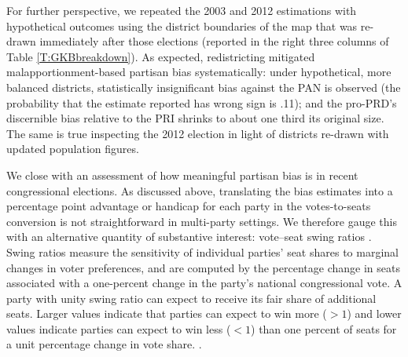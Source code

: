 \documentclass[letter,12pt]{article}
\let\footnote=\endnote
\begin{document}

For further perspective, we repeated the 2003 and 2012 estimations with hypothetical outcomes using the district boundaries of the map that was re-drawn immediately after those elections (reported in the right three columns of Table \ref{T:GKBbreakdown}). As expected, redistricting mitigated malapportionment-based partisan bias systematically: under hypothetical, more balanced districts, statistically insignificant bias against the PAN is observed (the probability that the estimate reported has wrong sign is .11); and the pro-PRD's discernible bias relative to the PRI shrinks to about one third its original size. The same is true inspecting the 2012 election in light of districts re-drawn with updated population figures. 


We close with an assessment of how meaningful partisan bias is in recent congressional elections. As discussed above, translating the bias estimates into a percentage point advantage or handicap for each party in the votes-to-seats conversion is not straightforward in multi-party settings. We therefore gauge this with an alternative quantity of substantive interest: vote--seat swing ratios \citep{tufte1973seatsVotes,niemi.fett1986swing}. Swing ratios measure the sensitivity of individual parties' seat shares to marginal changes in voter preferences, and are computed by the percentage change in seats associated with a one-percent change in the party's national congressional vote. A party with unity swing ratio can expect to receive its fair share of additional seats. Larger values indicate that parties can expect to win more ($>1$) and lower values indicate parties can expect to win less ($<1$) than one percent of seats for a unit percentage change in vote share. \citep[We rule out negative swing ratios corresponding to a party losing seats as it wins votes; for violations of the monotonicity principle of representation, see][]{balinskiYoung2001FairRep}. 
\end{document}
